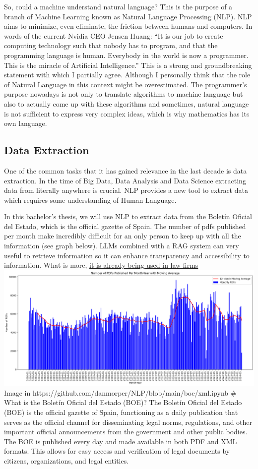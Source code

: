So, could a machine understand natural language? This is the purpose of
a branch of Machine Learning known as Natural Language Processing (NLP).
NLP aims to minimize, even eliminate, the friction between humans and
computers. In words of the current Nvidia CEO Jensen Huang: ``It is our
job to create computing technology such that nobody has to program, and
that the programming language is human. Everybody in the world is now a
programmer. This is the miracle of Artificial Intelligence.'' This is a
strong and groundbreaking statement with which I partially agree.
Although I personally think that the role of Natural Language in this
context might be overestimated. The programmer's purpose nowadays is not
only to translate algorithms to machine language but also to actually
come up with these algorithms and sometimes, natural language is not
sufficient to express very complex ideas, which is why mathematics has
its own language.

\subsection{Data Extraction}\label{data-extraction}

One of the common tasks that it has gained relevance in the last decade
is data extraction. In the time of Big Data, Data Analysis and Data
Science extracting data from literally anywhere is crucial. NLP provides
a new tool to extract data which requires some understanding of Human
Language.

In this bachelor's thesis, we will use NLP to extract data from the
Boletín Oficial del Estado, which is the official gazette of Spain. The
number of pdfs published per month make incredibly difficult for an only
person to keep up with all the information (see graph below). LLMs
combined with a RAG system can very useful to retrieve information so it
can enhance transparency and accessibility to information. What is more,
\href{https://www.truelaw.ai/blog/legal-rag-vs-rag-a-technical-exploration-of-retrieval-systems}{it
is already being used in law firms}
\includegraphics{images/pdfs_month.png} Image in
https://github.com/danmorper/NLP/blob/main/boe/xml.ipynb \# What is the
Boletín Oficial del Estado (BOE)? The Boletín Oficial del Estado (BOE)
is the official gazette of Spain, functioning as a daily publication
that serves as the official channel for disseminating legal norms,
regulations, and other important official announcements from the
government and other public bodies. The BOE is published every day and
made available in both PDF and XML formats. This allows for easy access
and verification of legal documents by citizens, organizations, and
legal entities.

